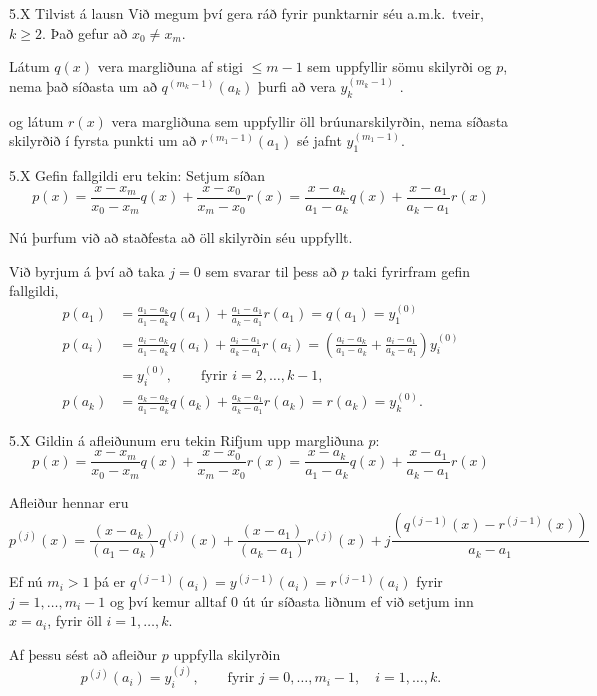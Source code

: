 \begin{frame}{5.X Tilvist á lausn} 
Við megum því gera ráð fyrir  punktarnir séu a.m.k.\ tveir,
$k\geq 2$.  Það gefur að $x_0 \not= x_m$.

\pause
\smallskip
Látum $q(x)$ vera margliðuna af stigi $\leq m-1$ sem uppfyllir sömu
skilyrði og $p$, nema það síðasta um að $q^{(m_k-1)}(a_k)$ þurfi að
vera $y_k^{(m_k-1)}$ .

\pause
\smallskip
og látum $r(x)$ vera margliðuna sem uppfyllir öll brúunarskilyrðin,
nema síðasta skilyrðið í fyrsta punkti um 
að $r^{(m_1-1)}(a_1)$ sé jafnt $y_1^{(m_1-1)}$. 

\end{frame}

\begin{frame}{5.X Gefin fallgildi eru tekin:}
Setjum síðan
$$
  p(x) = \frac{x-x_m}{x_0-x_m}q(x) 
  + \frac{x-x_0}{x_m-x_0}r(x)
  = \frac{x-a_k}{a_1-a_k}q(x)
  + \frac{x-a_1}{a_k-a_1}r(x)
$$

\pause
Nú þurfum við að staðfesta að öll skilyrðin séu uppfyllt.  

\pause
\smallskip
Við byrjum á því að taka $j=0$ sem svarar til þess að
$p$ taki fyrirfram gefin fallgildi,
\begin{align*}
  p(a_1) &= \frac{a_1-a_k}{a_1-a_k}q(a_1)
  + \frac{a_1-a_1}{a_k-a_1}r(a_1) = q(a_1) = y_1^{(0)}\\
  p(a_i) &= \frac{a_i-a_k}{a_1-a_k}q(a_i)
  + \frac{a_i-a_1}{a_k-a_1}r(a_i) 
  = \left( \frac{a_i-a_k}{a_1-a_k} 
    + \frac{a_i-a_1}{a_k-a_1} \right) y_i^{(0)} \\
    &= y_i^{(0)},  \qquad \text{fyrir } i=2,\ldots,k-1,\\
  p(a_k) &= \frac{a_k-a_k}{a_1-a_k}q(a_k)
  + \frac{a_k-a_1}{a_k-a_1}r(a_k) = r(a_k) = y_k^{(0)}.
\end{align*}
\end{frame}

\begin{frame}{5.X Gildin á afleiðunum eru tekin} 
Rifjum upp margliðuna $p$:
$$
  p(x) = \frac{x-x_m}{x_0-x_m}q(x) 
  + \frac{x-x_0}{x_m-x_0}r(x)
  = \frac{x-a_k}{a_1-a_k}q(x)
  + \frac{x-a_1}{a_k-a_1}r(x)
$$

\pause
Afleiður hennar eru
\begin{equation*}
  p^{(j)}(x) = \frac{(x-a_k)}{(a_1-a_k)}q^{(j)}(x)
  + \frac{(x-a_1)}{(a_k-a_1)}r^{(j)}(x)
  + j \frac{\left( q^{(j-1)}(x)-r^{(j-1)}(x)\right)}{a_k-a_1}
\end{equation*}

\pause
\smallskip
Ef nú $m_i > 1$ þá er $q^{(j-1)}(a_i) = y^{(j-1)}(a_i) =
r^{(j-1)}(a_i)$  fyrir $j = 1, \ldots, m_i-1$ og því kemur alltaf 
$0$ út úr síðasta liðnum ef við setjum inn $x = a_i$, fyrir öll 
$i = 1, \ldots, k$.

\pause
\smallskip
Af þessu sést að afleiður $p$ uppfylla skilyrðin
$$
  p^{(j)}(a_i) = y^{(j)}_i, \qquad \text{fyrir } j=0,\ldots,m_i-1, 
  \quad i=1,\ldots,k.
$$
\end{frame}

